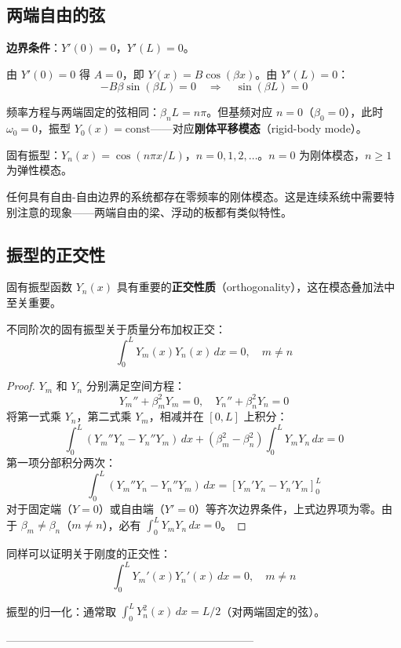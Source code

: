 \subsection{两端自由的弦}

\textbf{边界条件}：$Y'(0)=0$，$Y'(L)=0$。

由 $Y'(0)=0$ 得 $A=0$，即 $Y(x)=B\cos(\beta x)$。由 $Y'(L)=0$：
\[
-B\beta\sin(\beta L)=0 \quad\Rightarrow\quad \sin(\beta L)=0
\]

频率方程与两端固定的弦相同：$\beta_n L = n\pi$。但基频对应 $n=0$（$\beta_0=0$），此时 $\omega_0=0$，振型 $Y_0(x)=\text{const}$——对应\textbf{刚体平移模态}（rigid-body mode）。

固有振型：$Y_n(x)=\cos(n\pi x/L)$，$n=0,1,2,\dots$。$n=0$ 为刚体模态，$n\ge 1$ 为弹性模态。

\begin{remark}
任何具有自由-自由边界的系统都存在零频率的刚体模态。这是连续系统中需要特别注意的现象——两端自由的梁、浮动的板都有类似特性。
\end{remark}

\subsection{振型的正交性}

固有振型函数 $Y_n(x)$ 具有重要的\textbf{正交性质}（orthogonality），这在模态叠加法中至关重要。

\begin{theorem}[弦振型的正交性]
不同阶次的固有振型关于质量分布加权正交：
\[
\int_0^L Y_m(x) Y_n(x)\,dx = 0, \quad m \neq n
\]
\end{theorem}

\begin{proof}
$Y_m$ 和 $Y_n$ 分别满足空间方程：
\[
Y_m'' + \beta_m^2 Y_m = 0, \quad Y_n'' + \beta_n^2 Y_n = 0
\]
将第一式乘 $Y_n$，第二式乘 $Y_m$，相减并在 $[0,L]$ 上积分：
\[
\int_0^L (Y_m'' Y_n - Y_n'' Y_m)\,dx + (\beta_m^2-\beta_n^2)\int_0^L Y_m Y_n\,dx = 0
\]
第一项分部积分两次：
\[
\int_0^L (Y_m'' Y_n - Y_n'' Y_m)\,dx = [Y_m'Y_n - Y_n'Y_m]_0^L
\]
对于固定端（$Y=0$）或自由端（$Y'=0$）等齐次边界条件，上式边界项为零。由于 $\beta_m\neq\beta_n$（$m\neq n$），必有
$\int_0^L Y_m Y_n\,dx = 0$。
\end{proof}

同样可以证明关于刚度的正交性：
\[
\int_0^L Y_m'(x) Y_n'(x)\,dx = 0, \quad m \neq n
\]

振型的归一化：通常取 $\int_0^L Y_n^2(x)\,dx = L/2$（对两端固定的弦）。

--------------------------------------------------------------------

